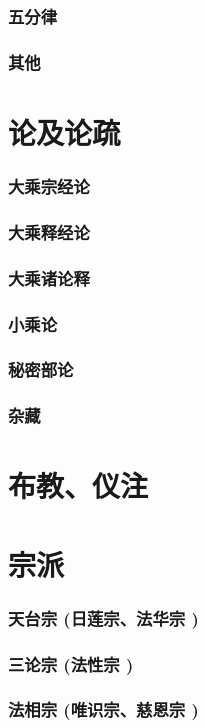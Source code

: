 \documentclass[UTF8]{../RepresentationUniverse}
\begin{document}
\subsubsection{五分律}
\subsubsection{其他}

\section{论及论疏}
\subsubsection{大乘宗经论}
\subsubsection{大乘释经论}
\subsubsection{大乘诸论释}
\subsubsection{小乘论}
\subsubsection{秘密部论}
\subsubsection{杂藏}

\section{布教、仪注}
\section{宗派}
\subsubsection{天台宗 (日莲宗、法华宗 )}
\subsubsection{三论宗 (法性宗 )}
\subsubsection{法相宗 (唯识宗、慈恩宗 )}
\end{document}
